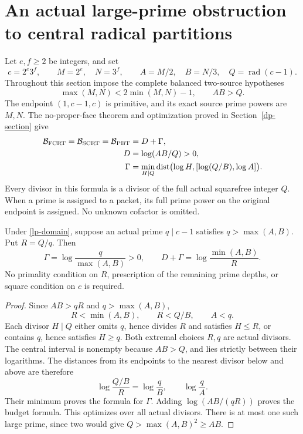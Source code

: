 \section{An actual large-prime obstruction to central radical partitions}
\label{lp18-section}

Let \(e,f\ge2\) be integers, and set
\[
 c=2^e3^f,\qquad M=2^e,\quad N=3^f,\qquad
 A=M/2,\quad B=N/3,\quad Q=\operatorname{rad}(c-1).
\]
Throughout this section impose the complete balanced two-source hypotheses
\begin{equation}\label{lp-domain}
 \max(M,N)<2\min(M,N)-1,\qquad AB>Q.
\end{equation}
The endpoint \((1,c-1,c)\) is primitive, and its exact source prime
powers are \(M,N\). The no-proper-face theorem and optimization proved
in Section~\ref{dp-section} give
\begin{align}
 \mathcal B_{\rm FCRT}=\mathcal B_{\rm SCRT}=\mathcal B_{\rm PBT}
     &=D+\Gamma,\label{lp-budget}\\
 D&=\log(AB/Q)>0,\notag\\
 \Gamma&=\min_{H\mid Q}
    \operatorname{dist}\bigl(\log H,[\log(Q/B),\log A]\bigr).\notag
\end{align}
Every divisor in this formula is a divisor of the full actual squarefree
integer \(Q\). When a prime is assigned to a packet, its full prime power
on the original endpoint is assigned. No unknown cofactor is omitted.

\begin{theorem}
\label{lp-exact-barrier}
Under \eqref{lp-domain}, suppose an actual prime \(q\mid c-1\)
satisfies \(q>\max(A,B)\). Put \(R=Q/q\). Then
\[
 \Gamma=\log\frac{q}{\max(A,B)}>0,\qquad
 D+\Gamma=\log\frac{\min(A,B)}R.
\]
No primality condition on \(R\), prescription of the remaining prime
depths, or square condition on \(c\) is required.
\end{theorem}
\begin{proof}
Since \(AB>qR\) and \(q>\max(A,B)\),
\[
 R<\min(A,B),\qquad R<Q/B,\qquad A<q.
\]
Each divisor \(H\mid Q\) either omits \(q\), hence divides \(R\)
and satisfies \(H\le R\), or contains \(q\), hence satisfies
\(H\ge q\). Both extremal choices \(R,q\) are actual divisors.
The central interval is nonempty because \(AB>Q\), and lies strictly
between their logarithms. The distances from its endpoints to the
nearest divisor below and above are therefore
\[
 \log\frac{Q/B}{R}=\log\frac qB,\qquad \log\frac qA.
\]
Their minimum proves the formula for \(\Gamma\). Adding
\(\log(AB/(qR))\) proves the budget formula. This optimizes over all
actual divisors. There is at most one such large prime, since two would
give \(Q>\max(A,B)^2\ge AB\).
\end{proof}

